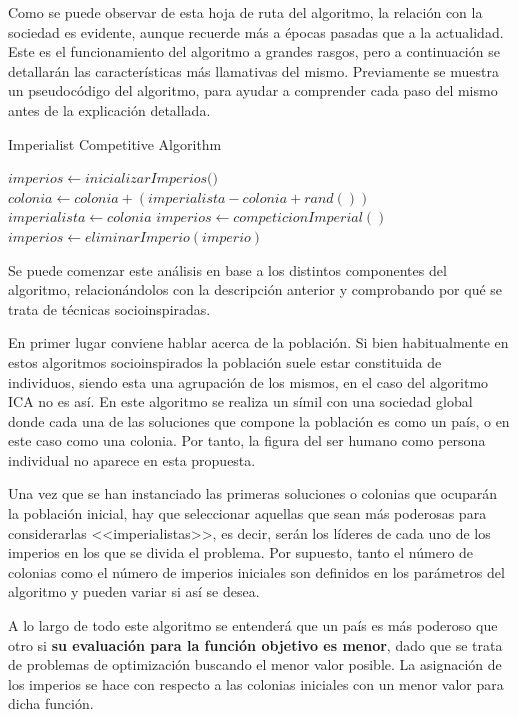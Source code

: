 Como se puede observar de esta hoja de ruta del algoritmo, la relación con la sociedad es evidente, aunque recuerde más a épocas pasadas que a la actualidad. Este es el funcionamiento del algoritmo a grandes rasgos, pero a continuación se detallarán las características más llamativas del mismo. Previamente se muestra un pseudocódigo del algoritmo, para ayudar a comprender cada paso del mismo antes de la explicación detallada.

\begin{algorithm}
	\caption{Imperialist Competitive Algorithm}
	\begin{algorithmic}[1]
		\State $imperios \gets \textit{inicializarImperios()}$
		\State $colonia \gets colonia + (imperialista - colonia + rand())$
		\State $imperialista \gets colonia$
		\EndIf
		\EndFor
		\State $imperios \gets competicionImperial()$
		\State $imperios \gets eliminarImperio(imperio)$
		\EndIf
		\EndWhile
	\end{algorithmic}
\end{algorithm}

Se puede comenzar este análisis en base a los distintos componentes del algoritmo, relacionándolos con la descripción anterior y comprobando por qué se trata de técnicas socioinspiradas.

En primer lugar conviene hablar acerca de la población. Si bien habitualmente en estos algoritmos socioinspirados la población suele estar constituida de individuos, siendo esta una agrupación de los mismos, en el caso del algoritmo ICA no es así. En este algoritmo se realiza un símil con una sociedad global donde cada una de las soluciones que compone la población es como un país, o en este caso como una colonia. Por tanto, la figura del ser humano como persona individual no aparece en esta propuesta.

Una vez que se han instanciado las primeras soluciones o colonias que ocuparán la población inicial, hay que seleccionar aquellas que sean más poderosas para considerarlas <<imperialistas>>, es decir, serán los líderes de cada uno de los imperios en los que se divida el problema. Por supuesto, tanto el número de colonias como el número de imperios iniciales son definidos en los parámetros del algoritmo y pueden variar si así se desea.

A lo largo de todo este algoritmo se entenderá que un país es más poderoso que otro si \textbf{su evaluación para la función objetivo es menor}, dado que se trata de problemas de optimización buscando el menor valor posible. La asignación de los imperios se hace con respecto a las colonias iniciales con un menor valor para dicha función.

